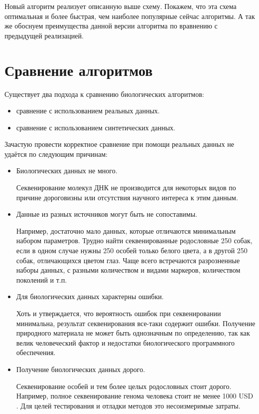 \documentclass{matmex-diploma-custom}
\begin{document}
Новый алгоритм реализует описанную выше схему. Покажем, что эта схема
оптимальная и более быстрая, чем наиболее популярные сейчас
алгоритмы. А так же обоснуем преимущества данной версии алгоритма по
вравнению с предыдущей реализацией.

\section{Сравнение алгоритмов}

Существует два подхода к сравнению биологических алгоритмов:
\begin{itemize}
\item сравнение с использованием реальных данных.
\item сравнение с использованием синтетических данных.
\end{itemize}

Зачастую провести корректное сравнение при помощи реальных данных не
удаётся по следующим причинам:

\begin{itemize}
\item Биологических данных не много.

  Секвенирование молекул ДНК не производится для некоторых видов по
  причине дороговизны или отсутствия научного интереса к этим данным.

\item Данные из разных источников могут быть не сопоставимы.

  Например, достаточно мало данных, которые отличаются минимальным
  набором параметров. Трудно найти секвенированные родословные 250
  собак, если в одном случае нужны 250 особей только белого цвета, а в
  другой 250 собак, отличающихся цветом глаз. Чаще всего встречаются
  разрозненные наборы данных, с разными количеством и видами маркеров,
  количеством поколений и т.п.

\item Для биологических данных характерны ошибки.

  Хоть и утверждается, что вероятность ошибок при секвенировании
  минимальна, результат секвенирования все-таки содержит
  ошибки. Получение природного материала не может быть однозначным по
  определению, так как велик человеческий фактор и недостатки
  биологического программного обеспечения.

\item Получение биологических данных дорого.

  Секвенирование особей и тем более целых родословных стоит
  дорого. Например, полное секвенирование генома человека стоит не
  менее 1000 USD \cite{kircher2010high}. Для целей тестирования и
  отладки методов это несоизмеримые затраты.

\end{itemize}
\end{document}
